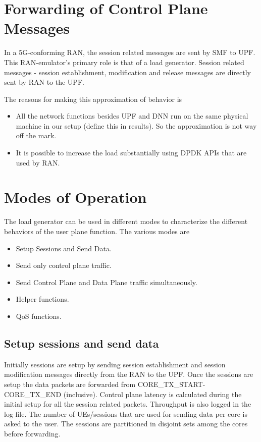 \section{Forwarding of Control Plane Messages}
In a 5G-conforming RAN, the session related messages are sent by SMF to UPF.
This RAN-emulator's primary role is that of a load generator. Session related messages - session establishment, modification and release messages are directly sent by RAN to the UPF.

The reasons for making this approximation of behavior is 
\begin{itemize}
	\item All the network functions besides UPF and DNN run on the same physical machine in our setup (define this in results). So the approximation is not way off the mark. 
	\item It is possible to increase the load substantially using DPDK APIs that are used by RAN.
\end{itemize}



\section{Modes of Operation}
The load generator can be used in different modes to characterize the different behaviors of the user plane function. The various modes are
\begin{itemize}
	\item Setup Sessions and Send Data.
	\item Send only control plane traffic.
	\item Send Control Plane and Data Plane traffic simultaneously.
	\item Helper functions.
	\item QoS functions.
\end{itemize}
\subsection{Setup sessions and send data}
Initially sessions are setup by sending session establishment and session modification messages directly from the RAN to the UPF.
Once the sessions are setup the data packets are forwarded from CORE\_TX\_START- CORE\_TX\_END (inclusive).
Control plane latency is calculated during the initial setup for all the session related packets. Throughput is also logged in the log file.
The number of UEs/sessions that are used for sending data per core is asked to the user. The sessions are partitioned in disjoint sets among the cores before forwarding.

